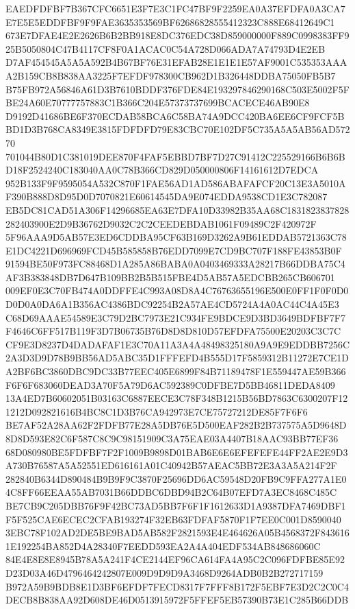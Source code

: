 \documentclass[UTF8,fontset=fandol,zihao=-4,a4paper]{ctexart}
\begin{document}
{{EAEDFDFBF7B367CFC6651E3F7E3C1FC47BF9F2259EA0A37EFDFA0A3CA7E7E5E5EDDFBF9F9FAE3635353569BF62686828555412323C888E68412649C1
673E7DFAE4E2E2626B6B2BB918E8DC376EDC38D859000000F889C0998383FF925B5050804C47B4117CF8F0A1ACAC0C54A728D066ADA7A74793D4E2EB
D7AF454545A5A5A592B4B67BF76E31EFAB28E1E1E1E57AF9001C535353AAAA2B159CB8B838AA3225F7EFDF978300CB962D1B326448DDBA75050FB5B7
B75FB972A56846A61D3B7610BDDF376FDE84E193297846290168C503E5002F5FBE24A60E70777757883C1B366C204E57373737699BCACECE46AB90E8
D9192D41686BE6F370ECDAB58BCA6C58BA74A9DCC420BA6EE6CF9FCF5BBD1D3B768CA8349E3815FDFDFD79E83CBC70E102DF5C735A5A5AB56AD57270
701044B80D1C381019DEE870F4FAF5EBBD7BF7D27C91412C225529166B6B6BD18F2524240C183040AA0C78B366CD829D050000806F14161612D7EDCA
952B133F9F9595054A532C870F1FAE56AD1AD586ABAFAFCF20C13E3A5010AF390B888D8D95D0D7070821E60614545DA9E074EDDA9538CD1E3C782087
EB5DC81CAD51A306F14296685EA63E7DFA10D33982B35AA68C1831823837828282403900E2D9B36762D9032C2C2CEEDEBDAB1061F09489C2F420972F
5F96AAA9D5AB57E3ED6CDDBA95CF63B169D3262A9B61EDDAB5721363C78E1DC4221D696969FCD45B585858B76EDD7099E7CD9BC707F188FE43853B0F
91594BE50F973FC88468D1A285A86BABA0A0403469333A28217B66DDBA75C4AF3B383848DB7D647B109BB2B5B515FBE4D5AB57A5EDCBB265CB606701
009EF0E3C70FB474A0DDFFE4C993A08D8A4C76763655196E500E0FF1F0F0D0D0D0A0DA6A1B356AC4386BDC92254B2A57AE4CD5724A4A0AC44C4A45E3
C68D69AAAE54589E3C79D2BC7973E21C934FE9BDCE9D3BD3649BDFBF7F7F4646C6FF517B119F3D7B06735B76D8D8D810D57EFDFA75500E20203C3C7C
CF9E3D8237D4DADAFAF1E3C70A11A3A4A48498325180A9A9E9EDDBB7256C2A3D3D9D78B9BB56AD5ABC35D1FFFEFD4B555D17F5859312B11272E7CE1D
A2BF6BC3860DBC9DC33B77EEC405E6899F84B71189478F1E559447AE59B366F6F6F683060DEAD3A70F5A79D6AC592389C0DFBE7D5BB46811DEDA8409
13A4ED7B60602051B03163C6887EECE3C78F348B1215B56BD7863C6300207F121212D092821616B4BC8C1D3B76CA942973E7CE75727212DE85F7F6F6
BE7AF52A28AA62F2FDFB77E28A5DB76E5D500EAF282B2B737575A5D9648D8D8D593E82C6F587C8C9C98151909C3A75EAE03A4407B18AAC93BB77EF36
68D080980BE5FDFBF7F2F1009B9898D01BAB6E6E6EFEFEFE44FF2AE2E9D3A730B76587A5A52551ED616161A01C40942B57AEAC5BB72E3A3A5A214F2F
282840B6344D890484B9B9F9C3870F25696DD6AC59548D20FB9C9FFA277A1E04C8FF66EEAA55AB7031B66DDBC6DBD94B2C64B07EFD7A3EC8468C485C
BE7CB9C205DBB76F9F42BC73AD5BB7F6F1F1612633D1A9387DFA7469DBF1F5F525CAE6ECEC2CFAB193274F32EB63FDFAF5870F1F7EE0C001D8590040
3EBC78F102AD2DE5BE9BAD5AB582F2821593E4E464626A05B4568372F8436161E192254BA852D4A28340F7EEDD593EA2A4A404EDF534AB848686060C
84E4E8E8E8945B78A5A241F4CE2144EF96CA614FA4A95C2C096FDFBE85E92D23D03A46D4796464242807E009D9D9D9A3468D9264ADB0B2B272717159
B972A59B9BDB8E1D3BF6EFDF7FECD8317F7FFF8B172F5EBF7E3D2C2C0C4DECB8B838AA92D608DE46D0513915972F5FFEF5EB57390B73E1C285B66DDB
}}
\end{document}
